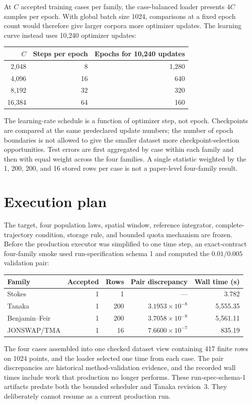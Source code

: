 \documentclass[11pt]{article}
\begin{document}
At $C$ accepted training cases per family, the case-balanced loader presents
$4C$ samples per epoch.  With global batch size 1024, comparisons at a fixed
epoch count would therefore give larger corpora more optimizer updates.  The
learning curve instead uses 10,240 optimizer updates:
\begin{center}
\begin{tabular}{@{}rrr@{}}
  \toprule
  $C$ & Steps per epoch & Epochs for 10,240 updates \\
  \midrule
  2,048  & 8   & 1,280 \\
  4,096  & 16  & 640 \\
  8,192  & 32  & 320 \\
  16,384 & 64  & 160 \\
  \bottomrule
\end{tabular}
\end{center}
The learning-rate schedule is a function of optimizer step, not epoch.
Checkpoints are compared at the same predeclared update numbers; the number
of epoch boundaries is not allowed to give the smaller dataset more
checkpoint-selection opportunities.  Test errors are first aggregated by
case within each family and then with equal weight across the four families.
A single statistic weighted by the 1, 200, 200, and 16 stored rows per case
is not a paper-level four-family result.

\section{Execution plan}
\label{sec:execution}

The target, four population laws, spatial window, reference integrator,
complete-trajectory condition, storage rule, and bounded quota mechanism are
frozen.  Before the production executor was simplified to one time step, an
exact-contract four-family smoke used run-specification schema 1 and computed
the $0.01/0.005$ validation pair:
\begin{center}
\small
\begin{tabular}{@{}lrrrr@{}}
  \toprule
  Family & Accepted & Rows & Pair discrepancy & Wall time (s) \\
  \midrule
  Stokes & 1 & 1   & ---                       & 3.782 \\
  Tanaka & 1 & 200 & $3.1953\times10^{-8}$     & 5,555.35 \\
  Benjamin--Feir & 1 & 200 & $3.7058\times10^{-8}$ & 5,561.11 \\
  JONSWAP/TMA & 1 & 16 & $7.6600\times10^{-7}$  & 835.19 \\
  \bottomrule
\end{tabular}
\end{center}
The four cases assembled into one checked dataset view containing 417 finite
rows on 1024 points, and the loader selected one time from each case.  The
pair discrepancies are historical method-validation evidence, and the
recorded wall times include work that production no longer performs.  These
run-spec-schema-1 artifacts predate both the bounded scheduler and Tanaka
revision~3.  They deliberately cannot resume as a current production run.
\end{document}

